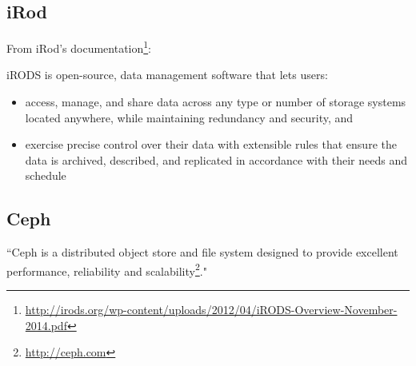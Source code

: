 \subsection{iRod}
From iRod's documentation\footnote{\url{http://irods.org/wp-content/uploads/2012/04/iRODS-Overview-November-2014.pdf}}:

iRODS is open-source, data management software that lets users:
\begin{itemize}
\item access, manage, and share data across any type or number of storage
systems located anywhere, while maintaining redundancy and security,
and
\item exercise precise control over their data with extensible rules that
ensure the data is archived, described, and replicated in accordance
with their needs and schedule
\end{itemize}

\subsection{Ceph}
``Ceph is a distributed object store and file system designed to provide excellent performance, 
reliability and scalability\footnote{\url{http://ceph.com}}."